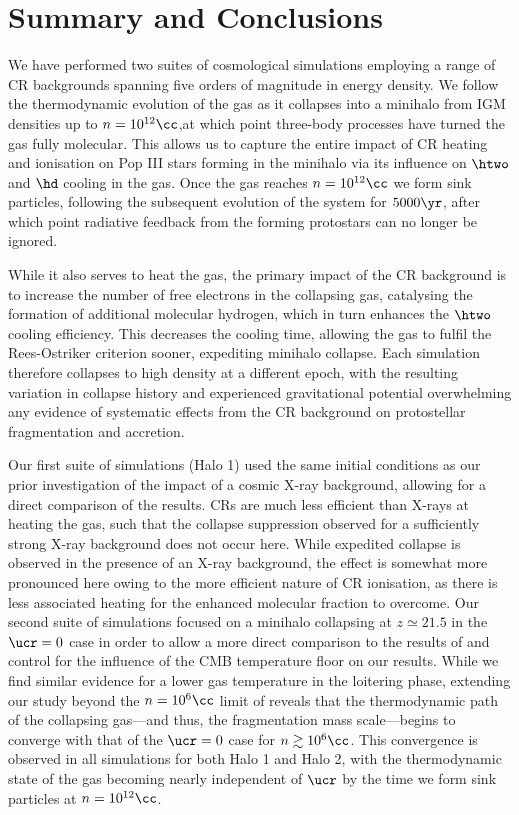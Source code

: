 \section{Summary and Conclusions}
\label{conclusions}

We have performed two suites of cosmological simulations employing a range of CR backgrounds spanning five orders of magnitude in energy density. 
We follow the thermodynamic evolution of the gas as it collapses into a minihalo from IGM densities up to $n=10^{12}\cc$,at which point three-body processes have turned the gas fully molecular. 
This allows us to capture the entire impact of CR heating and ionisation on Pop III stars forming in the minihalo via its influence on $\htwo$ and $\hd$ cooling in the gas.
Once the gas reaches $n=10^{12}\cc$ we form sink particles, following the subsequent evolution of the system for $5000\yr$, after which point radiative feedback from the forming protostars can no longer be ignored.

While it also serves to heat the gas, the primary impact of the CR background is to increase the number of free electrons in the collapsing gas, catalysing the formation of additional molecular hydrogen, which in turn enhances the $\htwo$ cooling efficiency.  
This decreases the cooling time, allowing the gas to fulfil the Rees-Ostriker criterion sooner, expediting minihalo collapse. 
Each simulation therefore collapses to high density at a different epoch, with the resulting variation in collapse history and experienced gravitational potential overwhelming any evidence of systematic effects from the CR background on protostellar fragmentation and accretion.

Our first suite of simulations (Halo 1) used the same initial conditions as our prior investigation of the impact of a cosmic X-ray background, allowing for a direct comparison of the results.
CRs are much less efficient than X-rays at heating the gas, such that the collapse suppression observed for a sufficiently strong X-ray background does not occur here.  
While expedited collapse is observed in the presence of an X-ray background, the effect is somewhat more pronounced here owing to the more efficient nature of CR ionisation, as there is less associated heating for the enhanced molecular fraction to overcome.
Our second suite of simulations focused on a minihalo collapsing at $z\simeq21.5$ in the $\ucr=0$ case in order to allow a more direct comparison to the results of \citet{StacyBromm2007} and control for the influence of the CMB temperature floor on our results.
While we find similar evidence for a lower gas temperature in the loitering phase, extending our study beyond the $n=10^6\cc$ limit of \citet{StacyBromm2007} reveals that the thermodynamic path of the collapsing gas---and thus, the fragmentation mass scale---begins to converge with that of the $\ucr=0$ case for $n\gtrsim10^6\cc$.  
This convergence is observed in all simulations for both Halo 1 and Halo 2, with the thermodynamic state of the gas becoming nearly independent of $\ucr$ by the time we form sink particles at $n=10^{12}\cc$.

